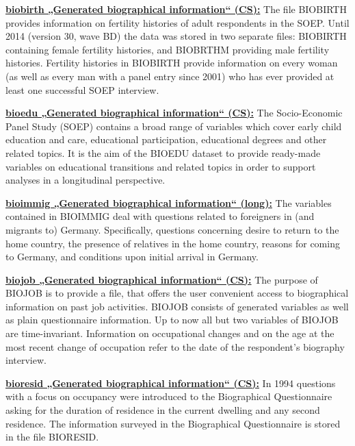 \documentclass[letterpaper,10pt,openany,onesideH,english]{sphinxmanual}
\begin{document}
 \href{https://paneldata.org/soep-core/data/biobirth}{\textbf{biobirth „Generated biographical information“ (CS):}} The file BIOBIRTH provides information on fertility histories of adult respondents in the SOEP. Until 2014 (version 30, wave BD) the data was stored in two separate files: BIOBIRTH containing female fertility histories, and BIOBRTHM providing male fertility histories. Fertility histories in BIOBIRTH provide information on every woman (as well as every man with a panel entry since 2001) who has ever provided at least one successful SOEP interview.

 \href{https://paneldata.org/soep-core/data/bioedu}{\textbf{bioedu „Generated biographical information“ (CS):}} The Socio-Economic Panel Study (SOEP) contains a broad range of variables which cover early child education and care, educational participation, educational degrees and other related topics. It is the aim of the BIOEDU dataset to provide ready-made variables on educational transitions and related topics in order to support analyses in a longitudinal perspective.

 \href{https://paneldata.org/soep-core/data/bioimmig}{\textbf{bioimmig „Generated biographical information“ (long):}} The variables contained in BIOIMMIG deal with questions related to foreigners in (and migrants to) Germany. Specifically, questions concerning desire to return to the home country, the presence of relatives in the home country, reasons for coming to Germany, and conditions upon initial arrival in Germany.

 \href{https://paneldata.org/soep-core/data/biojob}{\textbf{biojob „Generated biographical information“ (CS):}} The purpose of BIOJOB is to provide a file, that offers the user convenient access to biographical information on past job activities. BIOJOB consists of generated variables as well as plain questionnaire information. Up to now all but two variables of BIOJOB are time-invariant. Information on occupational changes and on the age at the most recent change of occupation refer to the date of the respondent’s biography interview.

 \href{https://paneldata.org/soep-core/data/bioresid}{\textbf{bioresid „Generated biographical information“ (CS):}} In 1994 questions with a focus on occupancy were introduced to the Biographical Questionnaire asking for the duration of residence in the current dwelling and any second residence. The information surveyed in the Biographical Questionnaire is stored in the file BIORESID.
\end{document}
